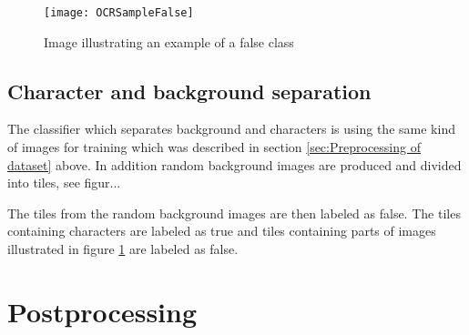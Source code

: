 \begin{figure}[H]
\centering
	\texttt{[image: OCRSampleFalse]}
	\caption{Image illustrating an example of a false class}
	\label{OCRSampleFalse}
\end{figure}

\subsection{Character and background separation}
\label{sec:Character and background separation}
The classifier which separates background and characters  is using the same kind of images for training which was described in section \ref{sec:Preprocessing of dataset} above. In addition random background images are produced and divided into tiles, see figur...


The tiles from the random background images are then labeled as false. The tiles containing characters are labeled as true and tiles containing parts of images illustrated in figure \ref{OCRSampleFalse} are labeled as false.
  

\section{Postprocessing}
\label{sec:Postprocessing}

